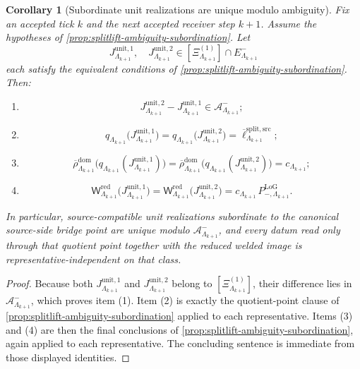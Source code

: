 \documentclass[11pt]{article}
\theoremstyle{definition}
\theoremstyle{plain}
\newtheorem{corollary}[definition]{Corollary}
\theoremstyle{remark}
\newcommand{\1}{\mathbf 1}
\begin{document}
\begin{corollary}[Subordinate unit realizations are unique modulo ambiguity]
\label{cor:splitlift-unit-realization-uniqueness}
Fix an accepted tick \(k\) and the next accepted receiver step \(k+1\).
Assume the hypotheses of \cref{prop:splitlift-ambiguity-subordination}.
Let
\[
J^{\mathrm{unit},1}_{\Lambda_{k+1}},
\quad
J^{\mathrm{unit},2}_{\Lambda_{k+1}}
\in
[\Xi^{(1)}_{\Lambda_{k+1}}]\cap E^-_{\Lambda_{k+1}}
\]
each satisfy the equivalent conditions of \cref{prop:splitlift-ambiguity-subordination}.
Then:
\begin{enumerate}[leftmargin=2em]
\item
  \[
  J^{\mathrm{unit},2}_{\Lambda_{k+1}}
  -
  J^{\mathrm{unit},1}_{\Lambda_{k+1}}
  \in
  \mathcal A^-_{\Lambda_{k+1}};
  \]
\item
  \[
  q_{\Lambda_{k+1}}
  \!\bigl(
  J^{\mathrm{unit},1}_{\Lambda_{k+1}}
  \bigr)
  =
  q_{\Lambda_{k+1}}
  \!\bigl(
  J^{\mathrm{unit},2}_{\Lambda_{k+1}}
  \bigr)
  =
  \overline\ell^{\mathrm{split,src}}_{\Lambda_{k+1}};
  \]
\item
  \[
  \overline{\rho}^{\mathrm{dom}}_{\Lambda_{k+1}}
  \!\bigl(
  q_{\Lambda_{k+1}}(J^{\mathrm{unit},1}_{\Lambda_{k+1}})
  \bigr)
  =
  \overline{\rho}^{\mathrm{dom}}_{\Lambda_{k+1}}
  \!\bigl(
  q_{\Lambda_{k+1}}(J^{\mathrm{unit},2}_{\Lambda_{k+1}})
  \bigr)
  =
  c_{\Lambda_{k+1}};
  \]
\item
  \[
  \mathsf W^{\mathrm{red}}_{\Lambda_{k+1}}
  \!\bigl(
  J^{\mathrm{unit},1}_{\Lambda_{k+1}}
  \bigr)
  =
  \mathsf W^{\mathrm{red}}_{\Lambda_{k+1}}
  \!\bigl(
  J^{\mathrm{unit},2}_{\Lambda_{k+1}}
  \bigr)
  =
  c_{\Lambda_{k+1}}\,
  P^{\mathrm{LoG}}_{-,\Lambda_{k+1}}.
  \]
\end{enumerate}
In particular, source-compatible unit realizations subordinate to the canonical source-side bridge
point are unique modulo
\(
\mathcal A^-_{\Lambda_{k+1}}
\),
and every datum read only through that quotient point together with the reduced welded image is
representative-independent on that class.
\end{corollary}

\begin{proof}
Because both
\(
J^{\mathrm{unit},1}_{\Lambda_{k+1}}
\)
and
\(
J^{\mathrm{unit},2}_{\Lambda_{k+1}}
\)
belong to
\(
[\Xi^{(1)}_{\Lambda_{k+1}}]
\),
their difference lies in
\(
\mathcal A^-_{\Lambda_{k+1}}
\),
which proves item \textnormal{(1)}.
Item \textnormal{(2)} is exactly the quotient-point clause of
\cref{prop:splitlift-ambiguity-subordination} applied to each representative.
Items \textnormal{(3)} and \textnormal{(4)} are then the final conclusions of
\cref{prop:splitlift-ambiguity-subordination}, again applied to each representative.
The concluding sentence is immediate from those displayed identities.
\end{proof}
\end{document}

